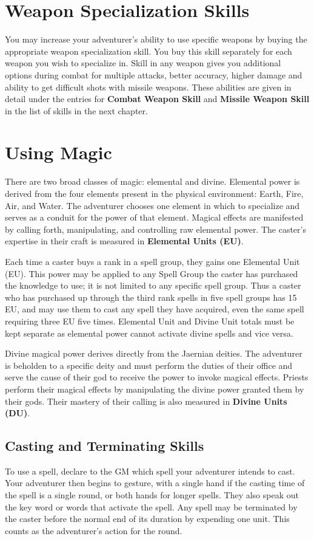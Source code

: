 \begin{multicols*}{2}
\section{Weapon Specialization Skills}
You may increase your adventurer's ability to use
specific weapons by buying the appropriate weapon specialization skill. You buy this skill separately for each weapon you wish to specialize in. Skill in any weapon gives you additional options during combat for multiple attacks, better accuracy, higher damage and ability to get difficult shots with missile weapons. These abilities are given in detail under the entries for \textbf{Combat Weapon Skill} and \textbf{Missile
Weapon Skill} in the list of skills in the next chapter.
\section{Using Magic}
There are two broad classes of magic: elemental
and divine. Elemental power is derived from the four elements present in the physical environment: Earth, Fire, Air, and Water. The adventurer chooses one element in which to specialize and serves as a conduit for the power of that element. Magical effects are manifested by calling forth, manipulating, and controlling raw elemental power. The caster's expertise in their craft is measured in \textbf{Elemental Units (EU)}.

Each time a caster buys a rank in a spell group, they gains one Elemental Unit (EU). This power may be applied to any Spell Group the caster has purchased the knowledge to use; it is not limited to any specific spell group. Thus a caster who has purchased up through the third rank spells in five spell groups has 15 EU, and may use them to cast any spell they have acquired, even the same spell requiring three EU five times. Elemental Unit and Divine Unit totals must be kept separate as elemental power cannot activate divine spells and vice versa.

Divine magical power derives directly from the Jaernian deities. The adventurer is beholden to a specific deity and must perform the duties of their office and serve the cause of their god to receive the power to invoke magical effects. Priests perform their magical effects by manipulating the divine power granted them by their gods. Their mastery of their calling is also measured in \textbf{Divine Units (DU)}.
\subsection{Casting and Terminating Skills}
To use a spell, declare to the GM which spell your adventurer intends to cast. Your adventurer then begins to gesture, with a single hand if the casting time of the spell is a single round, or both hands for longer spells. They also speak out the key word or words that activate the spell. Any spell may be terminated by the caster before
the normal end of its duration by expending one unit. This counts as the adventurer's action for the round.

\end{multicols*}
